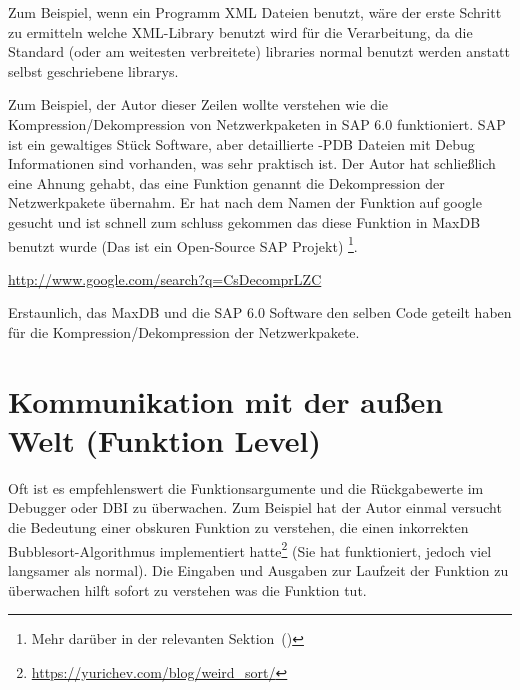 Zum Beispiel, wenn ein Programm XML Dateien benutzt, w\"are der erste Schritt zu ermitteln welche
XML-Library benutzt wird f\"ur die Verarbeitung, da die Standard (oder am weitesten verbreitete) libraries
normal benutzt werden anstatt selbst geschriebene librarys.


Zum Beispiel, der Autor dieser Zeilen wollte verstehen wie die Kompression/Dekompression von Netzwerkpaketen in SAP 6.0 funktioniert.
SAP ist ein gewaltiges St\"uck Software, aber detaillierte -\gls{PDB} Dateien mit Debug Informationen sind vorhanden, was sehr praktisch 
ist. Der Autor hat schließlich eine Ahnung gehabt, das eine Funktion genannt  die Dekompression der Netzwerkpakete \"ubernahm.
Er hat nach dem Namen der Funktion auf google gesucht und ist schnell zum schluss gekommen das diese Funktion in 
MaxDB benutzt wurde (Das ist ein Open-Source SAP Projekt) \footnote{Mehr dar\"uber in der relevanten Sektion~()}. 

\url{http://www.google.com/search?q=CsDecomprLZC}

Erstaunlich, das MaxDB und die SAP 6.0 Software den selben Code geteilt haben f\"ur die Kompression/Dekompression der Netzwerkpakete.

 

\section{Kommunikation mit der außen Welt (Funktion Level)} 
Oft ist es empfehlenswert die Funktionsargumente und die R\"uckgabewerte im
Debugger oder \ac{DBI} zu \"uberwachen. Zum Beispiel hat der Autor einmal
versucht die Bedeutung einer obskuren Funktion zu verstehen, die einen inkorrekten
Bubblesort-Algorithmus implementiert hatte\footnote{\url{https://yurichev.com/blog/weird_sort/}}
(Sie hat funktioniert, jedoch viel langsamer als normal). Die Eingaben und Ausgaben zur Laufzeit 
der Funktion zu \"uberwachen hilft sofort zu verstehen was die Funktion tut.













